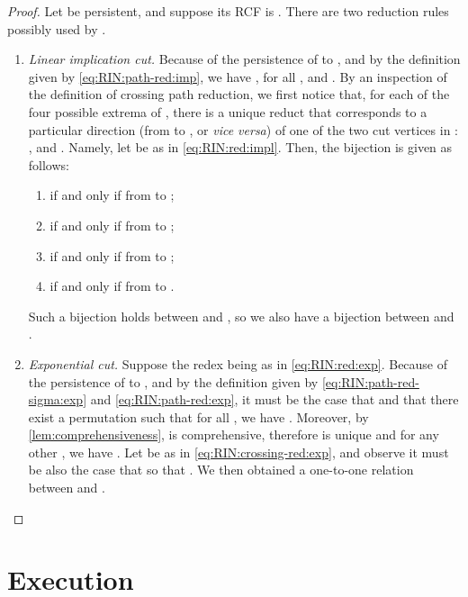 \begin{proof}
Let  be persistent, and suppose its RCF is
.
There are two reduction rules possibly used by .
\begin{enumerate}
\item
  \textit{Linear implication cut.}
  Because of the persistence of  to , and by the
  definition given by \autoref{eq:RIN:path-red:imp}, we have , 
  for all , and
    .
  By an inspection of the definition of crossing path reduction, we first 
  notice that, for each of the four possible extrema of , there is a 
  unique reduct that corresponds to a particular direction
  (from  to , or \textit{vice versa})
  of one of the two cut vertices in : 
  , and .
  Namely, let  be as in \autoref{eq:RIN:red:impl}.
  Then, the bijection is given as follows:
  \begin{enumerate}
  \item
     if and only if
     from  to ;
  \item
     if and only if
     from  to ;
  \item
     if and only if
     from  to ;
  \item
     if and only if
     from  to .
  \end{enumerate}
  Such a bijection holds between  and , so we also
  have a bijection between  and .
\item
  \textit{Exponential cut.}
  Suppose the redex  being as in \autoref{eq:RIN:red:exp}.
  Because of the persistence of  to , and by the definition given by 
  \autoref{eq:RIN:path-red-sigma:exp} and \ref{eq:RIN:path-red:exp}, it must be 
  the case that  and that there exist a permutation  
  such that for all , we have .
  Moreover, by \autoref{lem:comprehensiveness},  is 
  comprehensive, therefore 
   is unique and for any other , we have 
  .
  Let  be as in \autoref{eq:RIN:crossing-red:exp}, and observe it 
  must be also the case that  so that
  .
  We then obtained a one-to-one relation between  and .
\end{enumerate}
\vspace{-1.5em}
\end{proof}

\section{Execution} \label{sec:Ex}

